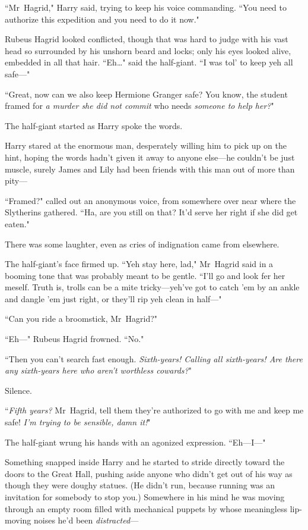 ``Mr~Hagrid," Harry said, trying to keep his voice commanding. ``You need to authorize this expedition and you need to do it now."

Rubeus Hagrid looked conflicted, though that was hard to judge with his vast head so surrounded by his unshorn beard and locks; only his eyes looked alive, embedded in all that hair. ``Eh{\ldots}" said the half-giant. ``I was tol' to keep yeh all safe—"

``Great, now can we also keep Hermione Granger safe? You know, the student framed for \emph{a murder she did not commit} who needs \emph{someone to help her?}"

The half-giant started as Harry spoke the words.

Harry stared at the enormous man, desperately willing him to pick up on the hint, hoping the words hadn't given it away to anyone else—he couldn't be just muscle, surely James and Lily had been friends with this man out of more than pity—

``Framed?" called out an anonymous voice, from somewhere over near where the Slytherins gathered. ``Ha, are you still on that? It'd serve her right if she did get eaten."

There was some laughter, even as cries of indignation came from elsewhere.

The half-giant's face firmed up. ``Yeh stay here, lad," Mr~Hagrid said in a booming tone that was probably meant to be gentle. ``I'll go and look fer her meself. Truth is, trolls can be a mite tricky—yeh've got to catch 'em by an ankle and dangle 'em just right, or they'll rip yeh clean in half—"

``Can you ride a broomstick, Mr~Hagrid?"

``Eh—" Rubeus Hagrid frowned. ``No."

``Then you can't search fast enough. \emph{Sixth-years! Calling all sixth-years! Are there any sixth-years here who aren't worthless cowards?}"

Silence.

``\emph{Fifth years?} Mr~Hagrid, tell them they're authorized to go with me and keep me safe! \emph{I'm trying to be sensible, damn it!}"

The half-giant wrung his hands with an agonized expression. ``Eh—I—"

Something snapped inside Harry and he started to stride directly toward the doors to the Great Hall, pushing aside anyone who didn't get out of his way as though they were doughy statues. (He didn't run, because running was an invitation for somebody to stop you.) Somewhere in his mind he was moving through an empty room filled with mechanical puppets by whose meaningless lip-moving noises he'd been \emph{distracted}—

